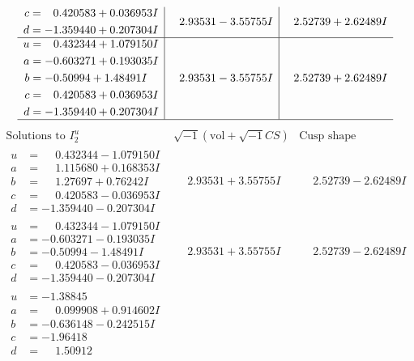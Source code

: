 \documentclass[1p]{elsarticle_modified}
\theoremstyle{definition}
\newcommand{\I}{\sqrt{-1}}
\begin{document}
$$\begin{array}{c|c|c}
\begin{aligned}
c &= \phantom{-}0.420583 + 0.036953 I \\
d &= -1.359440 + 0.207304 I\end{aligned}
 & \phantom{-}2.93531 - 3.55755 I & \phantom{-}2.52739 + 2.62489 I \\ \hline\begin{aligned}
u &= \phantom{-}0.432344 + 1.079150 I \\
a &= -0.603271 + 0.193035 I \\
b &= -0.50994 + 1.48491 I \\
c &= \phantom{-}0.420583 + 0.036953 I \\
d &= -1.359440 + 0.207304 I\end{aligned}
 & \phantom{-}2.93531 - 3.55755 I & \phantom{-}2.52739 + 2.62489 I\\
 \hline 
 \end{array}$$\newpage$$\begin{array}{c|c|c}  
\text{Solutions to }I^u_{2}& \I (\text{vol} + \sqrt{-1}CS) & \text{Cusp shape}\\
 \hline 
\begin{aligned}
u &= \phantom{-}0.432344 - 1.079150 I \\
a &= \phantom{-}1.115680 + 0.168353 I \\
b &= \phantom{-}1.27697 + 0.76242 I \\
c &= \phantom{-}0.420583 - 0.036953 I \\
d &= -1.359440 - 0.207304 I\end{aligned}
 & \phantom{-}2.93531 + 3.55755 I & \phantom{-}2.52739 - 2.62489 I \\ \hline\begin{aligned}
u &= \phantom{-}0.432344 - 1.079150 I \\
a &= -0.603271 - 0.193035 I \\
b &= -0.50994 - 1.48491 I \\
c &= \phantom{-}0.420583 - 0.036953 I \\
d &= -1.359440 - 0.207304 I\end{aligned}
 & \phantom{-}2.93531 + 3.55755 I & \phantom{-}2.52739 - 2.62489 I \\ \hline\begin{aligned}
u &= -1.38845\phantom{ +0.000000I} \\
a &= \phantom{-}0.099908 + 0.914602 I \\
b &= -0.636148 - 0.242515 I \\
c &= -1.96418\phantom{ +0.000000I} \\
d &= \phantom{-}1.50912\phantom{ +0.000000I}\end{aligned}

\end{array}$$
\end{document}
